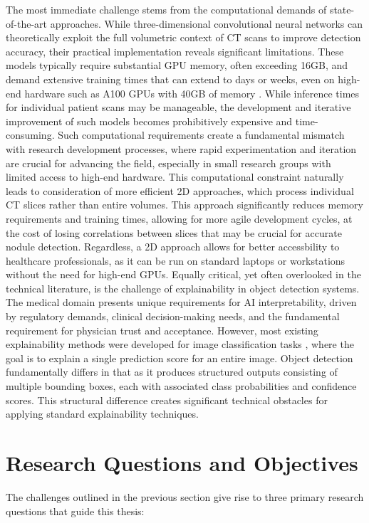 The most immediate challenge stems from the computational demands of state-of-the-art approaches. While three-dimensional convolutional neural networks can theoretically exploit the full volumetric context of CT scans to improve detection accuracy, their practical implementation reveals significant limitations. These models typically require substantial GPU memory, often exceeding 16GB, and demand extensive training times that can extend to days or weeks, even on high-end hardware such as A100 GPUs with 40GB of memory \cite{wu2018systematicanalysisstateoftheart3d}. While inference times for individual patient scans may be manageable, the development and iterative improvement of such models becomes prohibitively expensive and time-consuming. 
Such computational requirements create a fundamental mismatch with research development processes, where rapid experimentation and iteration are crucial for advancing the field, especially in small research groups with limited access to high-end hardware.
This computational constraint naturally leads to consideration of more efficient 2D approaches, which process individual CT slices rather than entire volumes. This approach significantly reduces memory requirements and training times, allowing for more agile development cycles, at the cost of losing correlations between slices that may be crucial for accurate nodule detection. Regardless, a 2D approach allows for better accessbility to healthcare professionals, as it can be run on standard laptops or workstations without the need for high-end GPUs.
Equally critical, yet often overlooked in the technical literature, is the challenge of explainability in object detection systems. The medical domain presents unique requirements for AI interpretability, driven by regulatory demands, clinical decision-making needs, and the fundamental requirement for physician trust and acceptance. However, most existing explainability methods were developed for image classification tasks \cite{chattopadhay_2018gradcam++,draelos2021hirescam,jiang2021layercam, selvaraju2019gradcam}, where the goal is to explain a single prediction score for an entire image. Object detection fundamentally differs in that as it produces structured outputs consisting of multiple bounding boxes, each with associated class probabilities and confidence scores.
This structural difference creates significant technical obstacles for applying standard explainability techniques.

\section{Research Questions and Objectives}
The challenges outlined in the previous section give rise to three primary research questions that guide this thesis:


